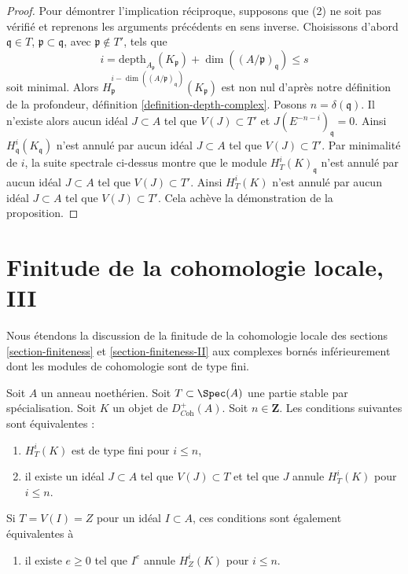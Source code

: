 \begin{proof}
\medskip\noindent
Pour démontrer l'implication réciproque, supposons que (2) ne soit pas vérifié et reprenons les arguments précédents en sens inverse. Choisissons d'abord $\mathfrak q \in T$, $\mathfrak p \subset \mathfrak q$, avec $\mathfrak p \not \in T'$, tels que
$$
i = \text{depth}_{A_\mathfrak p}(K_\mathfrak p) +
\dim((A/\mathfrak p)_\mathfrak q) \leq s
$$
soit minimal. Alors $H^{i - \dim((A/\mathfrak p)_\mathfrak q)}_\mathfrak p(K_\mathfrak p)$ est non nul d'après notre définition de la profondeur, définition \ref{definition-depth-complex}. Posons $n = \delta(\mathfrak q)$. Il n'existe alors aucun idéal $J \subset A$ tel que $V(J) \subset T'$ et $J(E^{-n - i})_\mathfrak q = 0$. Ainsi $H^i_\mathfrak q(K_\mathfrak q)$ n'est annulé par aucun idéal $J \subset A$ tel que $V(J) \subset T'$. Par minimalité de $i$, la suite spectrale ci-dessus montre que le module $H^i_T(K)_\mathfrak q$ n'est annulé par aucun idéal $J \subset A$ tel que $V(J) \subset T'$. Ainsi $H^i_T(K)$ n'est annulé par aucun idéal $J \subset A$ tel que $V(J) \subset T'$. Cela achève la démonstration de la proposition.
\end{proof}







\section{Finitude de la cohomologie locale, III}
\label{section-finiteness-III}

\noindent
Nous étendons la discussion de la finitude de la cohomologie locale des sections \ref{section-finiteness} et \ref{section-finiteness-II} aux complexes bornés inférieurement dont les modules de cohomologie sont de type fini.

\begin{lemma}
\label{lemma-check-finiteness-local-cohomology-by-annihilator-complex}
Soit $A$ un anneau noethérien. Soit $T \subset \Spec(A)$ une partie stable par spécialisation. Soit $K$ un objet de $D_{\textit{Coh}}^+(A)$. Soit $n \in \mathbf{Z}$. Les conditions suivantes sont équivalentes :
\begin{enumerate}
\item $H^i_T(K)$ est de type fini pour $i \leq n$,
\item il existe un idéal $J \subset A$ tel que $V(J) \subset T$ et tel que $J$ annule $H^i_T(K)$ pour $i \leq n$.
\end{enumerate}
Si $T = V(I) = Z$ pour un idéal $I \subset A$, ces conditions sont également équivalentes à
\begin{enumerate}
\item[(3)] il existe $e \geq 0$ tel que $I^e$ annule $H^i_Z(K)$ pour $i \leq n$.
\end{enumerate}
\end{lemma}

